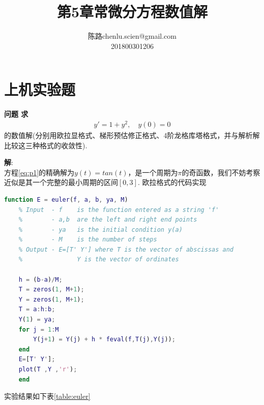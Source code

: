 \documentclass[UTF8]{ctexart}
\makeatletter
\newenvironment{problem}[2][问题]
{\begin{mdframed}[backgroundcolor=gray!20] \textbf{#1 #2} \\}
	{\end{mdframed}}
\newcommand\assignmentNumber{5}
\newcommand\studentName{陈路}
\newcommand\studentEmail{chenlu.scien@gmail.com}
\newcommand\studentNumber{201800301206}
\makeatother
\begin{document}
    
    \title{第\assignmentNumber 章\quad 常微分方程数值解}
    
    \author{\name \studentName \email \studentEmail \\
    \studentNumber
    }
    
    \maketitle

\section{上机实验题}

\begin{problem}{1}
	求
	\begin{align}
		y'=1 + y^2,\quad y(0)=0 \label{eq:p1}
	\end{align}
	的数值解(分别用欧拉显格式、梯形预估修正格式、4阶龙格库塔格式，并与解析解比较这三种格式的收敛性).
\end{problem}
\textbf{解}:\\
方程\ref{eq:p1}的精确解为$y(t)=tan(t)$，是一个周期为$\pi$的奇函数，我们不妨考察近似是其一个完整的最小周期的区间$[0,3]$.
欧拉格式的代码实现
\begin{lstlisting}[language=matlab]
	function E = euler(f, a, b, ya, M)
	% Input  - f    is the function entered as a string 'f'
	%        - a,b  are the left and right end points
	%        - ya   is the initial condition y(a)
	%        - M    is the number of steps
	% Output - E=[T' Y'] where T is the vector of abscissas and
	%               Y is the vector of ordinates
	
	h = (b-a)/M;
	T = zeros(1, M+1);
	Y = zeros(1, M+1);
	T = a:h:b;
	Y(1) = ya;
	for j = 1:M
		Y(j+1) = Y(j) + h * feval(f,T(j),Y(j));
	end
	E=[T' Y'];
	plot(T ,Y ,'r');
	end
\end{lstlisting}
实验结果如下表\ref{table:euler}\\
\end{document}
